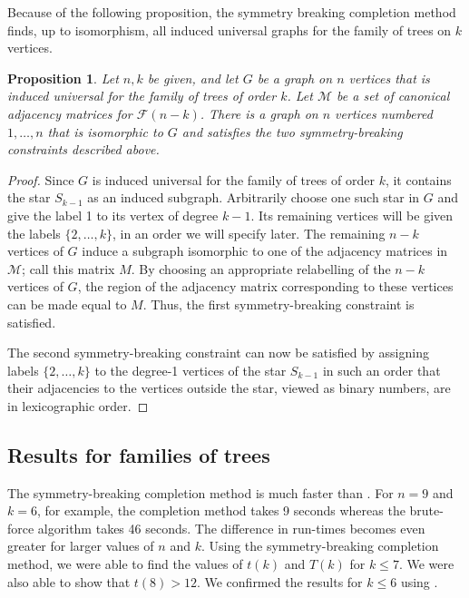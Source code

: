 \documentclass[12pt]{article}
\newcommand{\calF}{\ensuremath{\mathcal{F}}}
\newtheorem{proposition}{Proposition}
\begin{document}
Because of the following proposition, the symmetry breaking completion
method finds, up to isomorphism, all induced universal graphs for the family
of trees on $k$ vertices.

\begin{proposition}
    Let $n, k$ be given, and let $G$ be a graph on $n$ vertices that is
    induced universal for the family of trees of order $k$.  Let $\mathcal{M}$
    be a set of canonical adjacency matrices for $\calF(n-k)$.  There is
    a graph on $n$ vertices numbered $1, \dots, n$ that is isomorphic
    to $G$ and satisfies the two symmetry-breaking constraints described
    above.
\end{proposition}
\begin{proof}
    Since $G$ is induced universal for the family of trees of order $k$, it
    contains the star $S_{k-1}$ as an induced subgraph.  Arbitrarily
    choose one such star in $G$ and give the label 1 to its vertex of degree
    $k-1$.  Its remaining vertices will be given the labels $\{2, \dots, k\}$,
    in an order we will specify later.
    The remaining $n-k$ vertices of $G$ induce a subgraph isomorphic
    to one of the adjacency matrices in $\mathcal{M}$; call this matrix $M$.
    By choosing an appropriate relabelling of the $n-k$ vertices of $G$,
    the region of the adjacency matrix corresponding to these vertices
    can be made equal to $M$.  Thus, the first symmetry-breaking constraint
    is satisfied.

    The second symmetry-breaking constraint can now be satisfied by assigning
    labels $\{2, \dots, k\}$ to the degree-1 vertices of the star $S_{k-1}$
    in such an order that their adjacencies to the vertices outside the star,
    viewed as binary numbers, are in lexicographic order.
\end{proof}

\subsection{Results for families of trees}

The symmetry-breaking completion method is much faster than .
For $n=9$ and $k=6$, for example, the completion method takes 9 seconds whereas
the brute-force algorithm takes 46 seconds. The difference in run-times becomes
even greater for larger values of $n$ and $k$.
Using the symmetry-breaking completion method,
we were able to find the values of $t(k)$ and $T(k)$ for $k \leq 7$. We were also
able to show that $t(8) > 12$.  We confirmed
the results for $k \leq 6$ using .
\end{document}
